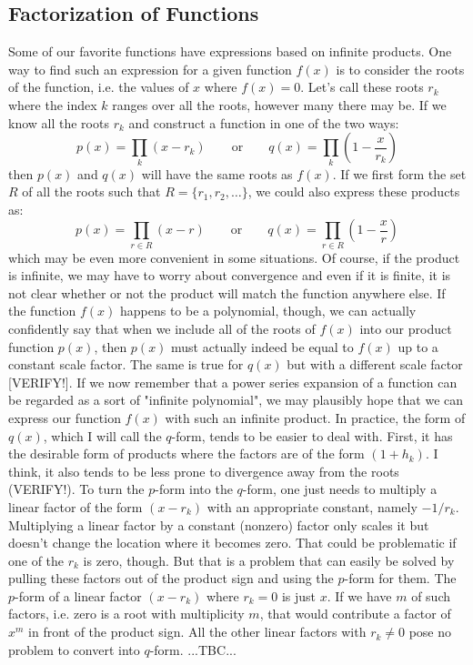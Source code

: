 \subsection{Factorization of Functions}  %
Some of our favorite functions have expressions based on infinite products. One way to find such an expression for a given function $f(x)$ is to consider the roots of the function, i.e. the values of $x$ where $f(x) = 0$. Let's call these roots $r_k$ where the index $k$ ranges over all the roots, however many there may be. If we know all the roots $r_k$ and construct a function in one of the two ways:
\begin{equation}
 p(x) = \prod_{k} (x - r_k)  \qquad \text{or} \qquad
 q(x) = \prod_{k} (1 - \frac{x}{r_k})
\end{equation}
then $p(x)$ and $q(x)$ will have the same roots as $f(x)$. If we first form the set $R$ of all the roots such that $R = \{r_1, r_2, \ldots \}$, we could also express these products as:
\begin{equation}
 p(x) = \prod_{r \in R} (x - r)  \qquad \text{or} \qquad
 q(x) = \prod_{r \in R} (1 - \frac{x}{r})
\end{equation}
which may be even more convenient in some situations. Of course, if the product is infinite, we may have to worry about convergence and even if it is finite, it is not clear whether or not the product will match the function anywhere else. If the function $f(x)$ happens to be a polynomial, though, we can actually confidently say that when we include all of the roots of $f(x)$ into our product function $p(x)$, then $p(x)$ must actually indeed be equal to $f(x)$ up to a constant scale factor. The same is true for $q(x)$ but with a different scale factor [VERIFY!]. If we now remember that a power series expansion of a function can be regarded as a sort of "infinite polynomial", we may plausibly hope that we can express our function $f(x)$ with such an infinite product. In practice, the form of $q(x)$, which I will call the $q$-form, tends to be easier to deal with. First, it has the desirable form of products where the factors are of the form $(1 + h_k)$. I think, it also tends to be less prone to divergence away from the roots (VERIFY!). To turn the $p$-form into the $q$-form, one just needs to multiply a linear factor of the form $(x - r_k)$ with an appropriate constant, namely $-1 / r_k$. Multiplying a linear factor by a constant (nonzero) factor only scales it but doesn't change the location where it becomes zero. That could be problematic if one of the $r_k$ is zero, though. But that is a problem that can easily be solved by pulling these factors out of the product sign and using the $p$-form for them. The $p$-form of a linear factor $(x - r_k)$ where $r_k = 0$ is just $x$. If we have $m$ of such factors, i.e. zero is a root with multiplicity $m$, that would contribute a factor of $x^m$ in front of the product sign. All the other linear factors with $r_k \neq 0$ pose no problem to convert into $q$-form. ...TBC...

